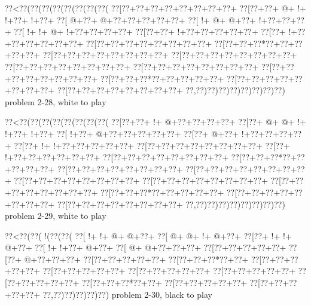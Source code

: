 \vbox{\vbox{\goo
\0??<\0??(\0??(\0??(\0??(\0??(\0??(\0??(\0??(
\0??[\0??+\0??+\0??+\0??+\0??+\0??+\0??+\0??+
\0??[\0??+\0??+\- @+\- !+\- !+\0??+\- !+\0??+
\0??[\- @+\0??+\- @+\0??+\0??+\0??+\0??+\0??+
\0??[\- !+\- @+\- @+\0??+\- !+\0??+\0??+\0??+
\0??[\- !+\- !+\- @+\- !+\0??+\0??+\0??+\0??+
\0??[\0??+\0??+\- !+\0??+\0??+\0??+\0??+\0??+
\0??[\0??+\- !+\0??+\0??+\0??+\0??+\0??+\0??+
\0??[\0??+\0??+\0??+\0??+\0??+\0??+\0??+\0??+
\0??[\0??+\0??+\0??*\0??+\0??+\0??+\0??+\0??+
\0??[\0??+\0??+\0??+\0??+\0??+\0??+\0??+\0??+
\0??[\0??+\0??+\0??+\0??+\0??+\0??+\0??+\0??+
\0??[\0??+\0??+\0??+\0??+\0??+\0??+\0??+\0??+
\0??[\0??+\0??+\0??+\0??+\0??+\0??+\0??+\0??+
\0??[\0??+\0??+\0??+\0??+\0??+\0??+\0??+\0??+
\0??[\0??+\0??+\0??*\0??+\0??+\0??+\0??+\0??+
\0??[\0??+\0??+\0??+\0??+\0??+\0??+\0??+\0??+
\0??[\0??+\0??+\0??+\0??+\0??+\0??+\0??+\0??+
\0??,\0??)\0??)\0??)\0??)\0??)\0??)\0??)\0??)
}
\hfil problem 2-28, white to play\hfil\break
}

\vbox{\vbox{\goo
\0??<\0??(\0??(\0??(\0??(\0??(\0??(\0??(\0??(
\0??[\0??+\0??+\- !+\- @+\0??+\0??+\0??+\0??+
\0??[\0??+\- @+\- @+\- !+\- !+\0??+\- !+\0??+
\0??[\- !+\0??+\- @+\0??+\0??+\0??+\0??+\0??+
\0??[\0??+\- @+\0??+\- !+\0??+\0??+\0??+\0??+
\0??[\0??+\- !+\- !+\0??+\0??+\0??+\0??+\0??+
\0??[\0??+\0??+\0??+\0??+\0??+\0??+\0??+\0??+
\0??[\0??+\- !+\0??+\0??+\0??+\0??+\0??+\0??+
\0??[\0??+\0??+\0??+\0??+\0??+\0??+\0??+\0??+
\0??[\0??+\0??+\0??*\0??+\0??+\0??+\0??+\0??+
\0??[\0??+\0??+\0??+\0??+\0??+\0??+\0??+\0??+
\0??[\0??+\0??+\0??+\0??+\0??+\0??+\0??+\0??+
\0??[\0??+\0??+\0??+\0??+\0??+\0??+\0??+\0??+
\0??[\0??+\0??+\0??+\0??+\0??+\0??+\0??+\0??+
\0??[\0??+\0??+\0??+\0??+\0??+\0??+\0??+\0??+
\0??[\0??+\0??+\0??*\0??+\0??+\0??+\0??+\0??+
\0??[\0??+\0??+\0??+\0??+\0??+\0??+\0??+\0??+
\0??[\0??+\0??+\0??+\0??+\0??+\0??+\0??+\0??+
\0??,\0??)\0??)\0??)\0??)\0??)\0??)\0??)\0??)
}
\hfil problem 2-29, white to play\hfil\break
}

\vbox{\vbox{\goo
\0??<\0??(\0??(\- !(\0??(\0??(
\0??[\- !+\- !+\- @+\- @+\0??+
\0??[\- @+\- @+\- !+\- @+\0??+
\0??[\0??+\- !+\- !+\- @+\0??+
\0??[\- !+\- !+\0??+\- @+\0??+
\0??[\- @+\- @+\0??+\0??+\0??+
\0??[\0??+\0??+\0??+\0??+\0??+
\0??[\0??+\- @+\0??+\0??+\0??+
\0??[\0??+\0??+\0??+\0??+\0??+
\0??[\0??+\0??+\0??*\0??+\0??+
\0??[\0??+\0??+\0??+\0??+\0??+
\0??[\0??+\0??+\0??+\0??+\0??+
\0??[\0??+\0??+\0??+\0??+\0??+
\0??[\0??+\0??+\0??+\0??+\0??+
\0??[\0??+\0??+\0??+\0??+\0??+
\0??[\0??+\0??+\0??*\0??+\0??+
\0??[\0??+\0??+\0??+\0??+\0??+
\0??[\0??+\0??+\0??+\0??+\0??+
\0??,\0??)\0??)\0??)\0??)\0??)
}
\hfil problem 2-30, black to play\hfil\break
}


